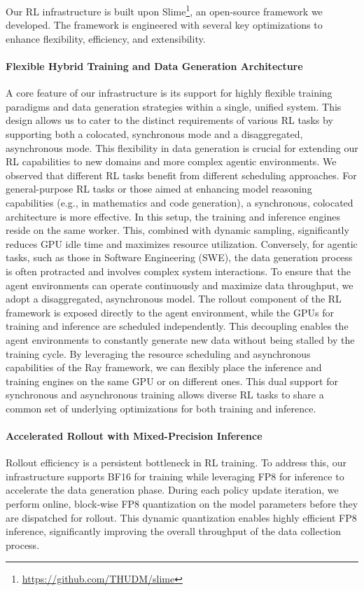 Our RL infrastructure is built upon Slime\footnote{\url{https://github.com/THUDM/slime}}, an open-source framework we developed. The framework is engineered with several key optimizations to enhance flexibility, efficiency, and extensibility.

\paragraph{Flexible Hybrid Training and Data Generation Architecture} A core feature of our infrastructure is its support for highly flexible training paradigms and data generation strategies within a single, unified system. This design allows us to cater to the distinct requirements of various RL tasks by supporting both a colocated, synchronous mode and a disaggregated, asynchronous mode. This flexibility in data generation is crucial for extending our RL capabilities to new domains and more complex agentic environments.
We observed that different RL tasks benefit from different scheduling approaches. For general-purpose RL tasks or those aimed at enhancing model reasoning capabilities (e.g., in mathematics and code generation), a synchronous, colocated architecture is more effective. In this setup, the training and inference engines reside on the same worker. This, combined with dynamic sampling, significantly reduces GPU idle time and maximizes resource utilization.
Conversely, for agentic tasks, such as those in Software Engineering (SWE), the data generation process is often protracted and involves complex system interactions. To ensure that the agent environments can operate continuously and maximize data throughput, we adopt a disaggregated, asynchronous model. The rollout component of the RL framework is exposed directly to the agent environment, while the GPUs for training and inference are scheduled independently. This decoupling enables the agent environments to constantly generate new data without being stalled by the training cycle.
By leveraging the resource scheduling and asynchronous capabilities of the Ray framework, we can flexibly place the inference and training engines on the same GPU or on different ones. This dual support for synchronous and asynchronous training allows diverse RL tasks to share a common set of underlying optimizations for both training and inference.

\paragraph{Accelerated Rollout with Mixed-Precision Inference} Rollout efficiency is a persistent bottleneck in RL training. To address this, our infrastructure supports BF16 for training while leveraging FP8 for inference to accelerate the data generation phase.
During each policy update iteration, we perform online, block-wise FP8 quantization on the model parameters before they are dispatched for rollout. This dynamic quantization enables highly efficient FP8 inference, significantly improving the overall throughput of the data collection process.


